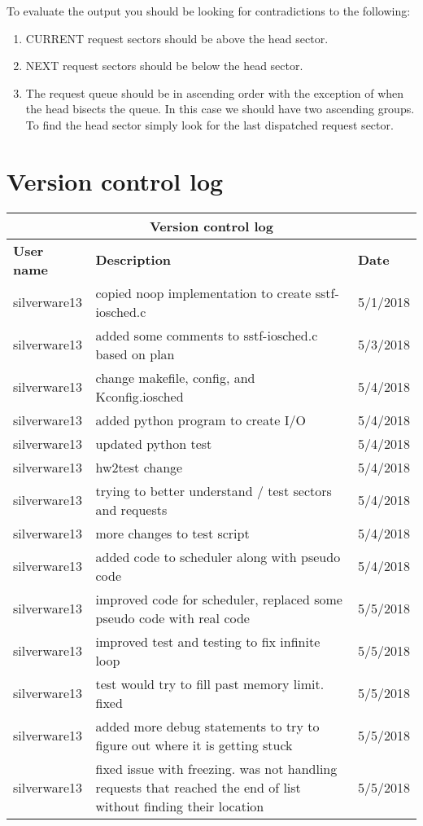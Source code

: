 \documentclass[journal,10pt,onecolumn,letterpaper,draftclsnofoot]{IEEEtran}
\begin{document}
To evaluate the output you should be looking for contradictions to the following:

\begin{enumerate}
\item CURRENT request sectors should be above the head sector.
\item NEXT request sectors should be below the head sector.
\item The request queue should be in ascending order with the exception of when the head bisects the queue. In this case we should have two ascending groups. To find the head sector simply look for the last dispatched request sector.
\end{enumerate}

\section{Version control log}

\bigskip
\centering
\begin{tabular}{ |p{3cm}|p{10cm}|p{3cm}|  }
 \hline
 \multicolumn{3}{|c|}{\textbf{Version control log}} \\
 \hline
 \textbf{User name} &\textbf{Description} &\textbf{Date}\\
 \hline
    silverware13   & 	copied noop implementation to create sstf-iosched.c    &5/1/2018\\
     \hline
    silverware13   & 	added some comments to sstf-iosched.c based on plan &5/3/2018\\
     \hline
    silverware13   & 	change makefile, config, and Kconfig.iosched    &5/4/2018\\
     \hline
    silverware13   & 	added python program to create I/O   &5/4/2018\\
     \hline
    silverware13   & 	updated python test    &5/4/2018\\
     \hline
    silverware13   & 	hw2\textunderscore test change    &5/4/2018\\
     \hline
    silverware13   & 	trying to better understand / test sectors and requests    &5/4/2018\\
 \hline
     silverware13   & 	more changes to test script    &5/4/2018\\
 \hline
      silverware13   & 	added code to scheduler along with pseudo code    &5/4/2018\\
 \hline
 silverware13   & 	improved code for scheduler, replaced some pseudo code with real code    &5/5/2018\\
 \hline
silverware13   & improved test and testing to fix infinite loop	&5/5/2018\\	
 \hline
silverware13   & test would try to fill past memory limit. fixed	&5/5/2018\\	
 \hline
 silverware13   & added more debug statements to try to figure out where it is getting stuck &5/5/2018\\	
 \hline
  silverware13   & fixed issue with freezing. was not handling requests that reached the end of list without finding their location &5/5/2018\\	
 \hline
\end{tabular}
\end{document}
